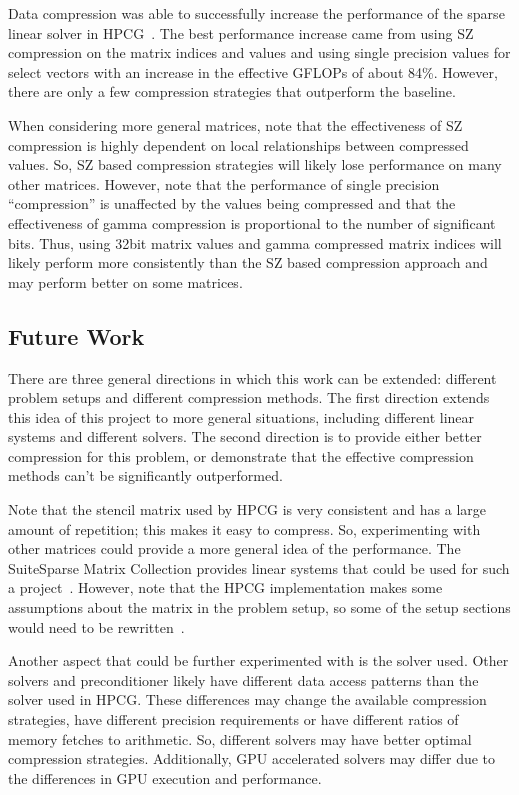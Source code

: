 Data compression was able to successfully increase the performance of the sparse linear solver in HPCG~\cite{Dongarra:2015:HPCG}.
The best performance increase came from using SZ compression on the matrix indices and values and using single precision values for select vectors with an increase in the effective GFLOPs of about 84\%.
However, there are only a few compression strategies that outperform the baseline.

When considering more general matrices, note that the effectiveness of SZ compression is highly dependent on local relationships between compressed values.
So, SZ based compression strategies will likely lose performance on many other matrices.
However, note that the performance of single precision ``compression'' is unaffected by the values being compressed and that the effectiveness of gamma compression is proportional to the number of significant bits.
Thus, using 32bit matrix values and gamma compressed matrix indices will likely perform more consistently than the SZ based compression approach and may perform better on some matrices.

\subsection{Future Work}
There are three general directions in which this work can be extended: different problem setups and different compression methods.
The first direction extends this idea of this project to more general situations, including different linear systems and different solvers.
The second direction is to provide either better compression for this problem, or demonstrate that the effective compression methods can't be significantly outperformed.

Note that the stencil matrix used by HPCG is very consistent and has a large amount of repetition; this makes it easy to compress.
So, experimenting with other matrices could provide a more general idea of the performance.
The SuiteSparse Matrix Collection provides linear systems that could be used for such a project~\cite{Davis:2011:FloridaMatrixCollection}.
However, note that the HPCG implementation makes some assumptions about the matrix in the problem setup, so some of the setup sections would need to be rewritten~\cite{Dongarra:2015:HPCG}.

Another aspect that could be further experimented with is the solver used.
Other solvers and preconditioner likely have different data access patterns than the solver used in HPCG.
These differences may change the available compression strategies, have different precision requirements or have different ratios of memory fetches to arithmetic.
So, different solvers may have better optimal compression strategies.
Additionally, GPU accelerated solvers may differ due to the differences in GPU execution and performance.

